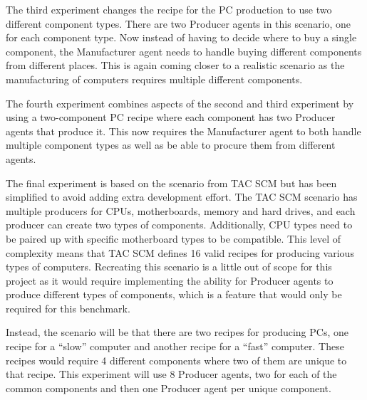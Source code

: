 The third experiment changes the recipe for the PC production to use two different component types.
There are two Producer agents in this scenario, one for each component type.
Now instead of having to decide where to buy a single component, the Manufacturer agent needs to handle buying different components from different places.
This is again coming closer to a realistic scenario as the manufacturing of computers requires multiple different components.

The fourth experiment combines aspects of the second and third experiment by using a two-component PC recipe where each component has two Producer agents that produce it.
This now requires the Manufacturer agent to both handle multiple component types as well as be able to procure them from different agents.

The final experiment is based on the scenario from TAC SCM but has been simplified to avoid adding extra development effort.
The TAC SCM scenario has multiple producers for CPUs, motherboards, memory and hard drives, and each producer can create two types of components.
Additionally, CPU types need to be paired up with specific motherboard types to be compatible.
This level of complexity means that TAC SCM defines 16 valid recipes for producing various types of computers.
Recreating this scenario is a little out of scope for this project as it would require implementing the ability for Producer agents to produce different types of components, which is a feature that would only be required for this benchmark.

Instead, the scenario will be that there are two recipes for producing PCs, one recipe for a ``slow'' computer and another recipe for a ``fast'' computer.
These recipes would require 4 different components where two of them are unique to that recipe.
This experiment will use 8 Producer agents, two for each of the common components and then one Producer agent per unique component.
